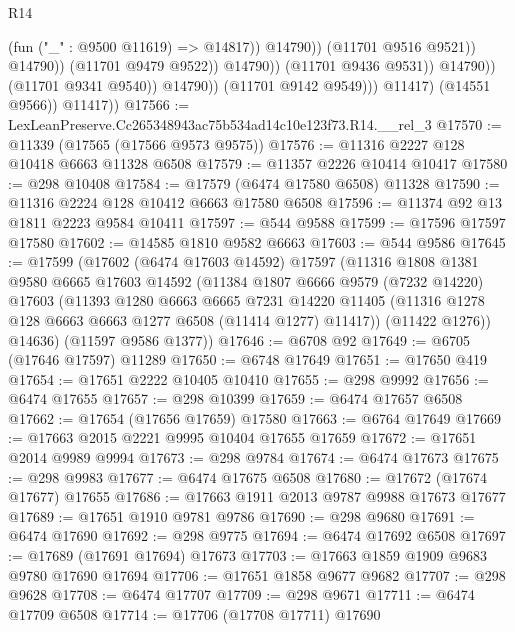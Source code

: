 \begin{lexlean}{R14}
\begin{coremodule}
                                              (fun ("_" : @9500 @11619) => @14817))
                                            @14790))
                                        (@11701 @9516 @9521))
                                      @14790))
                                  (@11701 @9479 @9522))
                                @14790))
                            (@11701 @9436 @9531))
                          @14790))
                      (@11701 @9341 @9540))
                    @14790))
                (@11701 @9142 @9549)))
            @11417)
          (@14551 @9566))
        @11417))
@17566 := LexLeanPreserve.Cc265348943ac75b534ad14c10e123f73.R14.__rel_3
@17570 := @11339 (@17565 (@17566 @9573 @9575))
@17576 := @11316 @2227 @128 @10418 @6663 @11328 @6508
@17579 := @11357 @2226 @10414 @10417
@17580 := @298 @10408
@17584 := @17579 (@6474 @17580 @6508) @11328
@17590 := @11316 @2224 @128 @10412 @6663 @17580 @6508
@17596 := @11374 @92 @13 @1811 @2223 @9584 @10411
@17597 := @544 @9588
@17599 := @17596 @17597 @17580
@17602 := @14585 @1810 @9582 @6663
@17603 := @544 @9586
@17645 := @17599
    (@17602
      (@6474 @17603 @14592)
      @17597
      (@11316
        @1808
        @1381
        @9580
        @6665
        @17603
        @14592
        (@11384
          @1807
          @6666
          @9579
          (@7232 @14220)
          @17603
          (@11393
            @1280
            @6663
            @6665
            @7231
            @14220
            @11405
            (@11316 @1278 @128 @6663 @6663 @1277 @6508 (@11414 @1277) @11417))
          (@11422 @1276))
        @14636)
      (@11597 @9586 @1377))
@17646 := @6708 @92
@17649 := @6705 (@17646 @17597) @11289
@17650 := @6748 @17649
@17651 := @17650 @419
@17654 := @17651 @2222 @10405 @10410
@17655 := @298 @9992
@17656 := @6474 @17655
@17657 := @298 @10399
@17659 := @6474 @17657 @6508
@17662 := @17654 (@17656 @17659) @17580
@17663 := @6764 @17649
@17669 := @17663 @2015 @2221 @9995 @10404 @17655 @17659
@17672 := @17651 @2014 @9989 @9994
@17673 := @298 @9784
@17674 := @6474 @17673
@17675 := @298 @9983
@17677 := @6474 @17675 @6508
@17680 := @17672 (@17674 @17677) @17655
@17686 := @17663 @1911 @2013 @9787 @9988 @17673 @17677
@17689 := @17651 @1910 @9781 @9786
@17690 := @298 @9680
@17691 := @6474 @17690
@17692 := @298 @9775
@17694 := @6474 @17692 @6508
@17697 := @17689 (@17691 @17694) @17673
@17703 := @17663 @1859 @1909 @9683 @9780 @17690 @17694
@17706 := @17651 @1858 @9677 @9682
@17707 := @298 @9628
@17708 := @6474 @17707
@17709 := @298 @9671
@17711 := @6474 @17709 @6508
@17714 := @17706 (@17708 @17711) @17690

\end{coremodule}
\end{lexlean}
